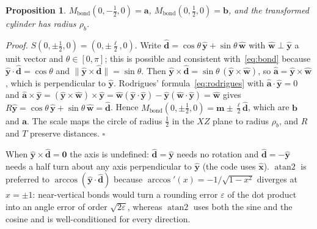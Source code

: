 \documentclass[a4paper, 11pt]{article}
\newtheorem{proposition}{{\bf Proposition}}
\begin{document}
\begin{proposition}\label{prop:bond}
$M_{\text{bond}}(0,-\tfrac12,0)=\mathbf a$, $M_{\text{bond}}(0,\tfrac12,0)=\mathbf b$, and the transformed cylinder has radius $\rho_b$.
\end{proposition}
\noindent\textit{Proof.} $S(0,\pm\tfrac12,0)=(0,\pm\tfrac\ell2,0)$. Write $\hat{\mathbf d}=\cos\theta\,\hat{\mathbf y}+\sin\theta\,\hat{\mathbf w}$ with
$\hat{\mathbf w}\perp\hat{\mathbf y}$ a unit vector and $\theta\in[0,\pi]$; this is possible and consistent with~\eqref{eq:bond} because
$\hat{\mathbf y}\cdot\hat{\mathbf d}=\cos\theta$ and $\|\hat{\mathbf y}\times\hat{\mathbf d}\|=\sin\theta$. Then
$\hat{\mathbf y}\times\hat{\mathbf d}=\sin\theta\,(\hat{\mathbf y}\times\hat{\mathbf w})$, so $\hat{\mathbf a}=\hat{\mathbf y}\times\hat{\mathbf w}$, which is
perpendicular to $\hat{\mathbf y}$. Rodrigues' formula~\eqref{eq:rodrigues} with $\hat{\mathbf a}\cdot\hat{\mathbf y}=0$ and
$\hat{\mathbf a}\times\hat{\mathbf y}=(\hat{\mathbf y}\times\hat{\mathbf w})\times\hat{\mathbf y}=\hat{\mathbf w}(\hat{\mathbf y}\cdot\hat{\mathbf y})-\hat{\mathbf y}(\hat{\mathbf w}\cdot\hat{\mathbf y})=\hat{\mathbf w}$
gives $R\hat{\mathbf y}=\cos\theta\,\hat{\mathbf y}+\sin\theta\,\hat{\mathbf w}=\hat{\mathbf d}$. Hence
$M_{\text{bond}}(0,\pm\tfrac12,0)=\mathbf m\pm\tfrac\ell2\hat{\mathbf d}$, which are $\mathbf b$ and $\mathbf a$. The scale maps the circle of radius
$\tfrac12$ in the $XZ$ plane to radius $\rho_b$, and $R$ and $T$ preserve distances. \hfill$\square$

When $\hat{\mathbf y}\times\hat{\mathbf d}=\mathbf 0$ the axis is undefined: $\hat{\mathbf d}=\hat{\mathbf y}$ needs no rotation and
$\hat{\mathbf d}=-\hat{\mathbf y}$ needs a half turn about any axis perpendicular to $\hat{\mathbf y}$ (the code uses $\hat{\mathbf x}$).
$\operatorname{atan2}$ is preferred to $\arccos(\hat{\mathbf y}\cdot\hat{\mathbf d})$ because $\arccos'(x)=-1/\sqrt{1-x^2}$ diverges at $x=\pm1$:
near-vertical bonds would turn a rounding error $\varepsilon$ of the dot product into an angle error of order $\sqrt{2\varepsilon}$, whereas
$\operatorname{atan2}$ uses both the sine and the cosine and is well-conditioned for every direction.
\end{document}
